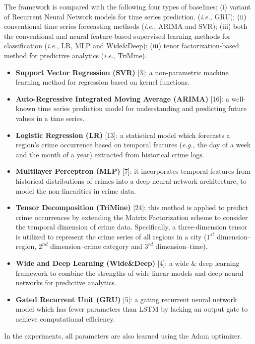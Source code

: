 The framework is compared with the following four
types of baselines: (i) variant of Recurrent Neural Network models for time series prediction. (\emph{i.e.,} GRU); (ii) conventional time
series forecasting methods (\emph{i.e.,} ARIMA and SVR); (iii) both the
conventional and neural feature-based supervised learning methods for classification (\emph{i.e.,} LR, MLP and Wide\&Deep); (iii) tenor
factorization-based method for predictive analytics (\emph{i.e.,} TriMine).
\begin{itemize}
    \item \textbf{Support Vector Regression (SVR)} [3]: a non-parametric machine learning method for regression based on kernel functions.
    
    \item \textbf{Auto-Regressive Integrated Moving Average (ARIMA)} [16]: a well-known time series prediction model for understanding
    and predicting future values in a time series.
    
    \item \textbf{Logistic Regression (LR)} [13]:  a statistical model which forecasts a region’s crime occurrence based on temporal features
    (\emph{e.g.,} the day of a week and the month of a year) extracted from
    historical crime logs.
    
    \item \textbf{Multilayer Perceptron (MLP)} [7]: it incorporates temporal features from historical distributions of crimes into a deep neural
    network architecture, to model the non-linearities in crime data.
    
    \item \textbf{Tensor Decomposition (TriMine)} [24]: this method is applied
    to predict crime occurrences by extending the Matrix Factorization scheme to consider the temporal dimension of crime data.
    Specifically, a three-dimension tensor is utilized to represent the
    crime series of all regions in a city ($1^{st}$ dimension–region, $2^{nd}$
    dimension–crime category and $3^{rd}$ dimension–time).
    
    \item \textbf{Wide and Deep Learning (Wide\&Deep)} [4]:  a wide \& deep
    learning framework to combine the strengths of wide linear
    models and deep neural networks for predictive analytics.
    
    \item \textbf{Gated Recurrent Unit (GRU)} [5]:  a gating recurrent neural network model which has fewer parameters than LSTM by lacking
    an output gate to achieve computational efficiency.
\end{itemize}
In the experiments, all parameters are also learned using the Adam
optimizer.


